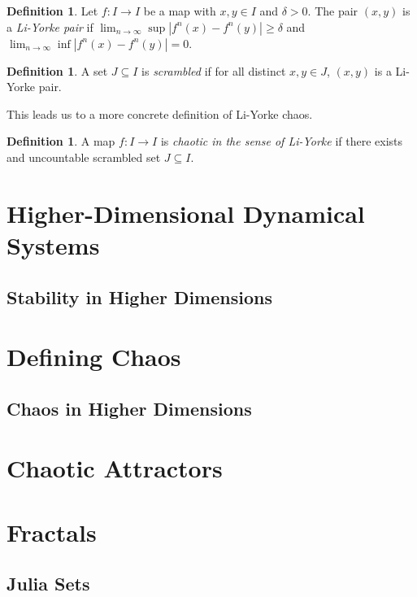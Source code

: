 \documentclass[11pt,a4paper,oneside]{memoir}
\theoremstyle{plain}
\theoremstyle{definition}
\newtheorem{defn}[thm]{Definition}
\begin{document}
\begin{defn}
    Let $f: I \to I$ be a map with $x, y \in I$ and $\delta > 0$. The pair $(x, y)$ is a \emph{Li-Yorke pair} if $\lim_{n \to \infty}\sup \left\lvert f^n(x) - f^n(y) \right\rvert \geq \delta$ and $\lim_{n\to\infty}\inf \left\lvert f^n(x) - f^n(y) \right\rvert = 0$.
\end{defn}

\begin{defn}
    A set $J \subseteq I$ is \emph{scrambled} if for all distinct $x, y \in J$, $(x, y)$ is a Li-Yorke pair.
\end{defn}

This leads us to a more concrete definition of Li-Yorke chaos.

\begin{defn}
    A map $f: I \to I$ is \emph{chaotic in the sense of Li-Yorke} if there exists and uncountable scrambled set $J \subseteq I$.
\end{defn}

\chapter{Higher-Dimensional Dynamical Systems}
\section{Stability in Higher Dimensions}

\chapter{Defining Chaos}
\section{Chaos in Higher Dimensions}
\chapter{Chaotic Attractors}

\chapter{Fractals}
\section{Julia Sets}


\end{document}
